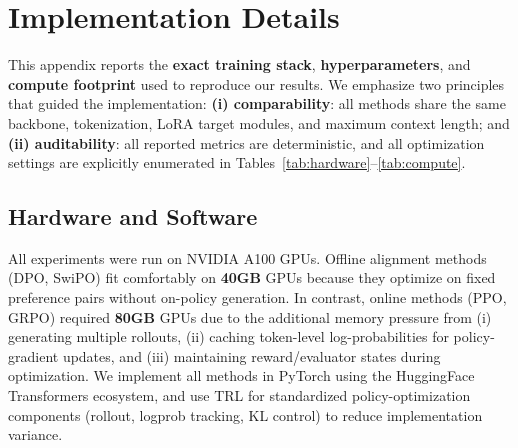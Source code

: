 \section{Implementation Details}
\label{sec:appendix_implementation}

\vspace{-0.25em}
\noindent
This appendix reports the \textbf{exact training stack}, \textbf{hyperparameters}, and \textbf{compute footprint} used to reproduce our results.
We emphasize two principles that guided the implementation:
\textbf{(i) comparability}: all methods share the same backbone, tokenization, LoRA target modules, and maximum context length; and
\textbf{(ii) auditability}: all reported metrics are deterministic, and all optimization settings are explicitly enumerated in Tables~\ref{tab:hardware}--\ref{tab:compute}.

\subsection{Hardware and Software}

\vspace{-0.25em}
\noindent
All experiments were run on NVIDIA A100 GPUs. Offline alignment methods (\textsc{DPO}, SwiPO) fit comfortably on \textbf{40GB} GPUs because they optimize on fixed preference pairs without on-policy generation.
In contrast, online methods (\textsc{PPO}, \textsc{GRPO}) required \textbf{80GB} GPUs due to the additional memory pressure from (i) generating multiple rollouts, (ii) caching token-level log-probabilities for policy-gradient updates, and (iii) maintaining reward/evaluator states during optimization.
We implement all methods in PyTorch using the HuggingFace Transformers ecosystem, and use TRL for standardized policy-optimization components (rollout, logprob tracking, KL control) to reduce implementation variance.

